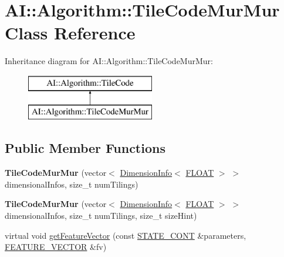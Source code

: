 \hypertarget{classAI_1_1Algorithm_1_1TileCodeMurMur}{\section{A\-I\-:\-:Algorithm\-:\-:Tile\-Code\-Mur\-Mur Class Reference}
\label{classAI_1_1Algorithm_1_1TileCodeMurMur}
}
Inheritance diagram for A\-I\-:\-:Algorithm\-:\-:Tile\-Code\-Mur\-Mur\-:\begin{figure}[H]
\begin{center}
\leavevmode
\includegraphics[height=2.000000cm]{classAI_1_1Algorithm_1_1TileCodeMurMur}
\end{center}
\end{figure}
\subsection*{Public Member Functions}
\begin{DoxyCompactItemize}
\item 
\hypertarget{classAI_1_1Algorithm_1_1TileCodeMurMur_a48746c4faa0e887b4a1fb16aba0cd6d9}{{\bfseries Tile\-Code\-Mur\-Mur} (vector$<$ \hyperlink{classAI_1_1Algorithm_1_1DimensionInfo}{Dimension\-Info}$<$ \hyperlink{namespaceAI_a41b74884a20833db653dded3918e05c3}{F\-L\-O\-A\-T} $>$ $>$ dimensional\-Infos, size\-\_\-t num\-Tilings)}\label{classAI_1_1Algorithm_1_1TileCodeMurMur_a48746c4faa0e887b4a1fb16aba0cd6d9}

\item 
\hypertarget{classAI_1_1Algorithm_1_1TileCodeMurMur_a55c39ff49b9686a90ed6f823986fe4c3}{{\bfseries Tile\-Code\-Mur\-Mur} (vector$<$ \hyperlink{classAI_1_1Algorithm_1_1DimensionInfo}{Dimension\-Info}$<$ \hyperlink{namespaceAI_a41b74884a20833db653dded3918e05c3}{F\-L\-O\-A\-T} $>$ $>$ dimensional\-Infos, size\-\_\-t num\-Tilings, size\-\_\-t size\-Hint)}\label{classAI_1_1Algorithm_1_1TileCodeMurMur_a55c39ff49b9686a90ed6f823986fe4c3}

\item 
virtual void \hyperlink{classAI_1_1Algorithm_1_1TileCodeMurMur_abd19bfe7dd3ddace0cec0ad9a8715392}{get\-Feature\-Vector} (const \hyperlink{namespaceAI_aff63ec21d97dd5f086fddbc3103f5707}{S\-T\-A\-T\-E\-\_\-\-C\-O\-N\-T} \&parameters, \hyperlink{namespaceAI_a23a39e1b301a5c1345fa508796940631}{F\-E\-A\-T\-U\-R\-E\-\_\-\-V\-E\-C\-T\-O\-R} \&fv)
\end{DoxyCompactItemize}
